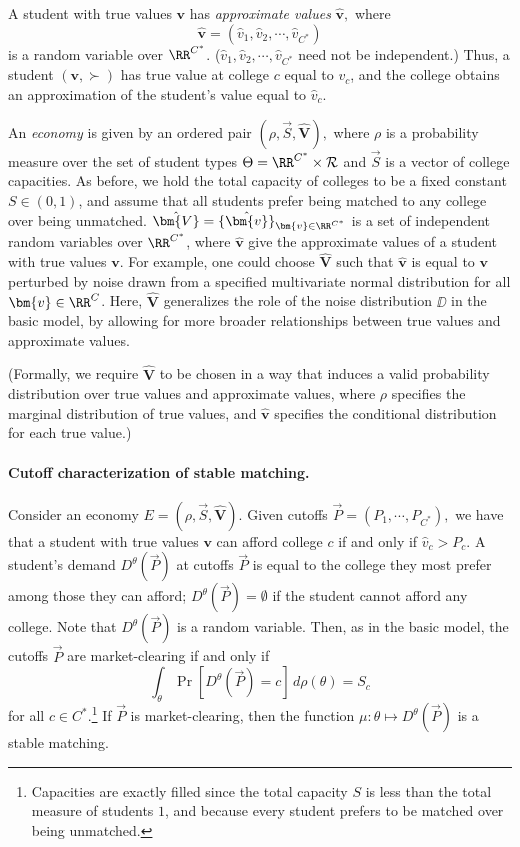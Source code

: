 \documentclass[10pt]{article}
\begin{document}
\begin{ReviewVerbatim}
A student with true values $\bm{v}$ has \textit{approximate values} $\hat{\bm{v}},$ where
\begin{equation}
    \hat{\bm{v}} = (\hat{v}_1, \hat{v}_2, \cdots, \hat{v}_{C^*})
\end{equation}
is a random variable over $\RR^{C^*}$. ($\hat{v}_1, \hat{v}_2, \cdots, \hat{v}_{C^*}$ need not be independent.) Thus, a student $(\bm{v},\succ)$ has true value at college $c$ equal to $v_c$, and the college obtains an approximation of the student's value equal to $\hat{v}_c.$

An \textit{economy} is given by an ordered pair $(\rho, \vec{S}, \hat{\bm{V}}),$ where $\rho$ is a probability measure over the set of student types $\Theta = \RR^{C^*}\times \mathcal{R}$ and $\vec{S}$ is a vector of college capacities. As before, we hold the total capacity of colleges to be a fixed constant $S\in (0,1)$, and assume that all students prefer being matched to any college over being unmatched. $\hat{\bm{V}} = \{\hat{\bm{v}}\}_{\bm{v}\in \RR^{C^*}}$ is a set of independent random variables over $\RR^{C^*}$, where $\hat{\bm{v}}$ give the approximate values of a student with true values $\bm{v}$. For example, one could choose $\hat{\bm{V}}$ such that $\hat{\bm{v}}$ is equal to $\bm{v}$ perturbed by noise drawn from a specified multivariate normal distribution for all $\bm{v}\in \RR^C$. Here, $\hat{\bm{V}}$ generalizes the role of the noise distribution $\DD$ in the basic model, by allowing for more broader relationships between true values and approximate values.

(Formally, we require $\hat{\bm{V}}$ to be chosen in a way that induces a valid probability distribution over true values and approximate values, where $\rho$ specifies the marginal distribution of true values, and $\hat{\bm{v}}$ specifies the conditional distribution for each true value.)

\paragraph{Cutoff characterization of stable matching.}
Consider an economy $E=(\rho, \vec{S}, \hat{\bm{V}}).$ Given cutoffs $\vec{P} = (P_1, \cdots, P_{C^*}),$ we have that a student with true values $\bm{v}$ can afford college $c$ if and only if $\hat{v}_c > P_c$. A student's demand $D^{\theta}(\vec{P})$ at cutoffs $\vec{P}$ is equal to the college they most prefer among those they can afford; $D^{\theta}(\vec{P})=\emptyset$ if the student cannot afford any college. Note that $D^{\theta}(\vec{P})$ is a random variable. Then, as in the basic model, the cutoffs $\vec{P}$ are market-clearing if and only if
\begin{equation}
    \int_{\theta} \Pr[D^{\theta}(\vec{P})=c]\,d\rho(\theta) = S_c
\end{equation}
for all $c\in {C^*}$.\footnote{Capacities are exactly filled since the total capacity $S$ is less than the total measure of students $1$, and because every student prefers to be matched over being unmatched.} If $\vec{P}$ is market-clearing, then the function $\mu:\theta\mapsto D^{\theta}(\vec{P})$ is a stable matching.


\end{ReviewVerbatim}
\end{document}
